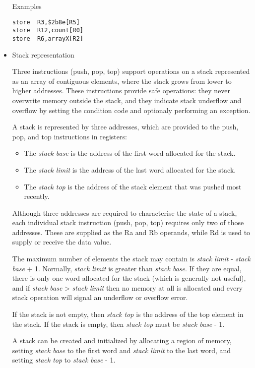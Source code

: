 \documentclass[11pt]{article}
\begin{document}
\begin{itemize}
Examples

\begin{verbatim}
store  R3,$2b8e[R5]
store  R12,count[R0]
store  R6,arrayX[R2]
\end{verbatim}

\item Stack representation
\label{sec:org7359ef1}

Three instructions (push, pop, top) support operations on a stack
represented as an array of contiguous elements, where the stack grows
from lower to higher addresses.  These instructions provide safe
operations: they never overwrite memory outside the stack, and they
indicate stack underflow and overflow by setting the condition code
and optionaly performing an exception.

A stack is represented by three addresses, which are provided to the
push, pop, and top instructions in registers:
\begin{itemize}
\item The \emph{stack base} is the address of the first word allocated for the
stack.
\item The \emph{stack limit} is the address of the last word allocated for the
stack.
\item The \emph{stack top} is the address of the stack element that was pushed
most recently.
\end{itemize}

Although three addresses are required to characterise the state of a
stack, each individual stack instruction (push, pop, top) requires
only two of those addresses.  These are supplied as the Ra and Rb
operands, while Rd is used to supply or receive the data value.

The maximum number of elements the stack may contain is \emph{stack
limit} - \emph{stack base} + 1.  Normally, \emph{stack limit} is greater than
\emph{stack base}.  If they are equal, there is only one word allocated for
the stack (which is generally not useful), and if \emph{stack base} >
\emph{stack limit} then no memory at all is allocated and every stack
operation will signal an underflow or overflow error.

If the stack is not empty, then \emph{stack top} is the address of the top
element in the stack.  If the stack is empty, then \emph{stack top} must be
\emph{stack base} - 1.

A stack can be created and initialized by allocating a region of
memory, setting \emph{stack base} to the first word and \emph{stack limit} to
the last word, and setting \emph{stack top} to \emph{stack base} - 1.


\end{itemize}
\end{document}
